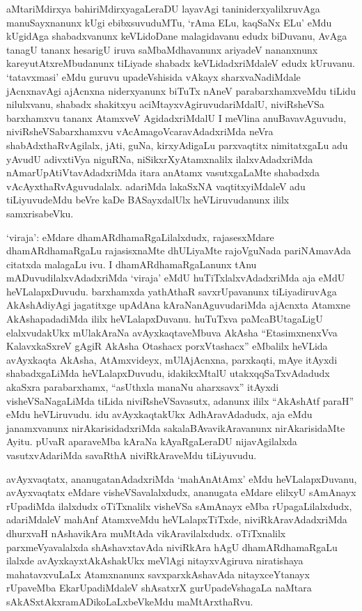 
\begin{artha}
aMtariMdirxya bahiriMdirxyagaLeraDU layavAgi taniniderxyalilxruvAga manuSayxnanunx kUgi ebibxsuvuduMTu, `rAma ELu, kaqSaNx ELu' eMdu kUgidAga shabadxvanunx keVLidoDane malagidavanu edudx biDuvanu, AvAga tanagU tananx hesarigU iruva saMbaMdhavanunx ariyadeV nananxnunx kareyutAtxreMbudanunx tiLiyade shabadx keVLidadxriMdaleV edudx kUruvanu. `tatavxmasi' eMdu guruvu upadeVshisida vAkayx sharxvaNadiMdale jAcnxnavAgi ajAcnxna niderxyanunx biTuTx nAneV parabarxhamxveMdu tiLidu nilulxvanu, shabadx shakitxyu aciMtayxvAgiruvudariMdalU, niviRsheVSa barxhamxvu tananx AtamxveV AgidadxriMdalU I meVlina anuBavavAguvudu, niviRsheVSabarxhamxvu vAcAmagoVcaravAdadxriMda neVra shabAdxthaRvAgilalx, jAti, guNa, kirxyAdigaLu parxvaqtitx nimitatxgaLu adu yAvudU adivxtiVya niguRNa, niSikxrXyAtamxnalilx ilalxvAdadxriMda nAmarUpAtiVtavAdadxriMda itara anAtamx vasutxgaLaMte shabadxda vAcAyxthaRvAguvudalalx. adariMda lakaSxNA vaqtitxyiMdaleV adu tiLiyuvudeMdu beVre kaDe BASayxdalUlx heVLiruvudanunx ililx samxrisabeVku. 

`viraja': eMdare dhamARdhamaRgaLilalxdudx, rajasesxMdare dhamARdhamaRgaLu rajasisxnaMte dhULiyaMte rajoVguNada pariNAmavAda citatxda malagaLu ivu. I dhamARdhamaRgaLanunx tAnu mADuvudilalxvAdadxriMda `viraja' eMdU huTiTxlalxvAdadxriMda aja eMdU heVLalapxDuvudu. barxhamxda yathAthaR savxrUpavanunx tiLiyadiruvAga AkAshAdiyAgi jagatitxge upAdAna kAraNanAguvudariMda ajAcnxta Atamxne AkAshapadadiMda ililx heVLalapxDuvanu. huTuTxva paMcaBUtagaLigU elalxvudakUkx mUlakAraNa avAyxkaqtaveMbuva AkAsha ``EtasimxnenxVva KalavxkaSxreV gAgiR AkAsha Otashacx porxVtashacx'' eMbalilx heVLida avAyxkaqta AkAsha, AtAmxvideyx, mUlAjAcnxna, parxkaqti, mAye itAyxdi shabadxgaLiMda heVLalapxDuvudu, idakikxMtalU utakxqqSaTxvAdadudx akaSxra parabarxhamx, ``asUthxla manaNu aharxsavx'' itAyxdi visheVSaNagaLiMda tiLida niviRsheVSavasutx, adanunx ililx ``AkAshAtf paraH'' eMdu heVLiruvudu. idu avAyxkaqtakUkx AdhAravAdadudx, aja eMdu janamxvanunx nirAkarisidadxriMda sakalaBAvavikAravanunx nirAkarisidaMte Ayitu. pUvaR aparaveMba kAraNa kAyaRgaLeraDU nijavAgilalxda vasutxvAdariMda savaRthA niviRkAraveMdu tiLiyuvudu.

avAyxvaqtatx, ananugatanAdadxriMda `mahAnAtAmx' eMdu heVLalapxDuvanu, avAyxvaqtatx eMdare visheVSavalalxdudx, ananugata eMdare elilxyU sAmAnayx rUpadiMda ilalxdudx oTiTxnalilx visheVSa sAmAnayx eMba rUpagaLilalxdudx, adariMdaleV mahAnf AtamxveMdu heVLalapxTiTxde, niviRkAravAdadxriMda dhurxvaH nAshavikAra muMtAda vikAravilalxdudx. oTiTxnalilx parxmeVyavalalxda shAshavxtavAda niviRkAra hAgU dhamARdhamaRgaLu ilalxde avAyxkayxtAkAshakUkx meVlAgi nitayxvAgiruva niratishaya mahatavxvuLaLx Atamxnanunx savxparxkAshavAda nitayxceYtanayx rUpaveMba EkarUpadiMdaleV shAsatxrX gurUpadeVshagaLa naMtara sAkASxtAkxramADikoLaLxbeVkeMdu maMtArxthaRvu.
\end{artha}


